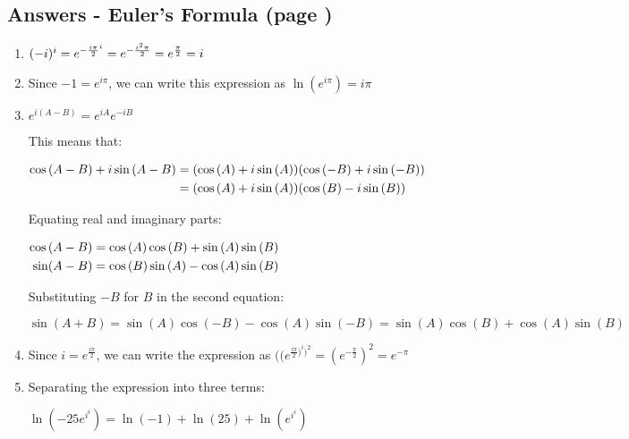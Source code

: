 \documentclass[../main.tex]{subfiles}
\begin{document}
\subsection*{Answers - Euler's Formula (page \pageref{eulersformula})}

\begin{spacing}{1.5}
\begin{enumerate}
    \item 
    \((-i)^i=e^{-\frac{i\pi}{2}^{i}}\\
    =e^{-\frac{i^2 \pi}{2}}\\
    =e^{\frac{\pi}{2}}=i\)

    \item 
    Since \(-1=e^{i \pi}\), we can write this expression as \(\ln{(e^{i \pi})}=i \pi\)

    \item 
    \(e^{i(A-B)}=e^{iA}e^{-iB}\)

    This means that:

    $
    \!
    \begin{aligned}[t]
    \cos{(A-B)+i\sin{(A-B)}}
    &=(\cos{(A)+i\sin{(A)}})(\cos{(-B)+i\sin{(-B)}})\\
    &=(\cos{(A)+i\sin{(A)}})(\cos{(B)-i\sin{(B)}})
    \end{aligned}\\
    $
    
    Equating real and imaginary parts:

    $
    \!
    \begin{aligned}[t]
    \cos{(A-B)}
    &=\cos{(A)}\cos{(B)}+\sin{(A)}\sin{(B)}\\
    \sin(A-B)
    &=\cos{(B)}\sin{(A)}-\cos{(A)}\sin{(B)}\\
    \end{aligned}\\
    $

    Substituting \(-B\) for \(B\) in the second equation:

    \(\sin{(A+B)}=\sin{(A)}\cos{(-B)}-\cos{(A)}\sin{(-B)}=\sin{(A)}\cos{(B)}+\cos{(A)}\sin{(B)}\)

    \item 
    Since \(i=e^{\frac{i \pi}{2}}\), we can write the expression as \(((e^{\frac{i \pi}{2})^i)^2}=(e^{-\frac{\pi}{2}})^2=e^{-\pi}\)

    \item 
    Separating the expression into three terms:

    \(\ln{(-25e^{i^{i}})}=\ln(-1)+\ln(25)+\ln(e^{i^{i}})\)


\end{enumerate}
\end{spacing}
\end{document}
